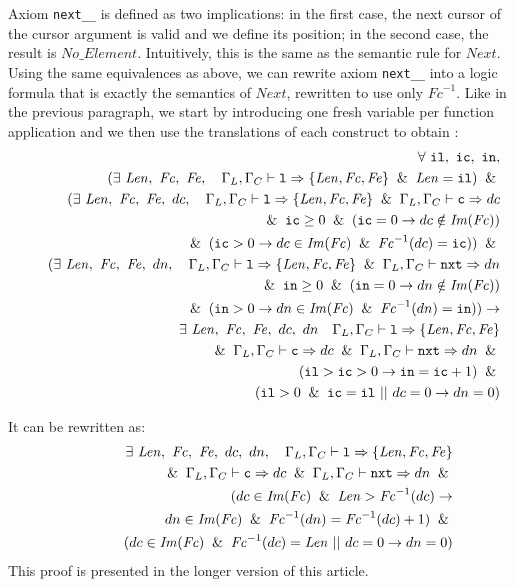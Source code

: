 \documentclass[runningheads,a4paper]{llncs}
\newcommand{\envL}{\ensuremath{\Gamma_L}\xspace}
\newcommand{\envC}{\ensuremath{\Gamma_C}\xspace}
\newcommand{\eval}{\envL, \envC \vdash}
\newcommand{\Fc}{\ensuremath{\mathit{Fc}}\xspace}
\newcommand{\FcInv}{\ensuremath{\mathit{Fc}^{-1}}\xspace}
\newcommand{\Fe}{\ensuremath{\mathit{Fe}}\xspace}
\newcommand{\typL}{\ensuremath{\{\Len,\Fc,\Fe\}}\xspace}
\newcommand{\ImFc}{\ensuremath{\mathit{Im}(\Fc)}\xspace}
\newcommand{\Next}{\ensuremath{\mathit{Next}}\xspace}
\newcommand{\NoElement}{\ensuremath{\mathit{No\_Element}}\xspace}
\newcommand{\Len}{\ensuremath{\mathit{Len}}\xspace}
\begin{document}
Axiom \verb|next__| is defined as two implications: in the first case, the next
cursor of the cursor argument is valid and we define its position; in the
second case, the result is \NoElement. Intuitively, this is the same as the
semantic rule for \Next. Using the same equivalences as above, we can rewrite
axiom \verb|next__| into a logic formula that is exactly the semantics of
\Next, rewritten to use only \FcInv.
\ifdefined\longversion
Like in the previous paragraph, we start by introducing one fresh
variable per function application and we then use the translations
of each construct to obtain :
\begin{eqnarray*}
  &&\forall \ \verb|il|,\ \verb|ic|,\ \verb|in|,\\
  &&\quad(\exists\ \Len,\ \Fc,\ \Fe, \quad\eval \verb|l| \Rightarrow \typL \And \Len = \verb|il|) \And \\
  &&\quad(\exists\ \Len,\ \Fc,\ \Fe,\ dc, \quad\eval \verb|l| \Rightarrow \typL \And \eval \verb|c| \Rightarrow dc\\
  &&\quad\quad \And \verb|ic|\geq0 \And (\verb|ic|=0 \rightarrow dc \notin \ImFc) \\
  &&\quad\quad \And (\verb|ic|>0 \rightarrow dc \in \ImFc \And \FcInv(dc)=\verb|ic|)) \And\\
  &&\quad(\exists\ \Len,\ \Fc,\ \Fe,\ dn, \quad\eval \verb|l| \Rightarrow \typL \And \eval \verb|nxt| \Rightarrow dn\\
  &&\quad\quad \And \verb|in|\geq0 \And (\verb|in|=0 \rightarrow dn \notin \ImFc) \\
  &&\quad\quad \And (\verb|in|>0 \rightarrow dn \in \ImFc \And \FcInv(dn)=\verb|in|)) \rightarrow\\
  &&\quad\quad\quad\exists\ \Len,\ \Fc,\ \Fe,\ dc,\ dn \quad\eval \verb|l| \Rightarrow \typL\\
  &&\quad\quad\quad\quad\And \eval \verb|c| \Rightarrow dc \And \eval \verb|nxt| \Rightarrow dn \And\\
  &&\quad\quad\quad\quad\quad (\verb|il| > \verb|ic| > 0 \rightarrow \verb|in| = \verb|ic| + 1) \And\\
  &&\quad\quad\quad\quad\quad (\verb|il| > 0 \And \verb|ic| = \verb|il| \ || \ dc = 0 \rightarrow dn = 0)
\end{eqnarray*}

It can be rewritten as:
{\small
\begin{eqnarray*}
  &&\exists\ \Len,\ \Fc,\ \Fe,\ dc,\ dn, \quad\eval \verb|l| \Rightarrow \typL\\
  && \And \eval \verb|c| \Rightarrow dc \And \eval \verb|nxt| \Rightarrow dn \And\\
  &&\quad\quad\quad (dc \in \ImFc \And \Len > \FcInv(dc) \rightarrow\\
  &&\quad\quad\quad\quad\quad\quad dn \in \ImFc \And\FcInv(dn) = \FcInv(dc) + 1) \And\\
  &&\quad\quad\quad (dc \in \ImFc \And \FcInv(dc)=\Len \ ||\ dc = 0\rightarrow dn = 0)
\end{eqnarray*}
}
\else
This proof is presented in the longer version of this article.
\fi
\end{document}
